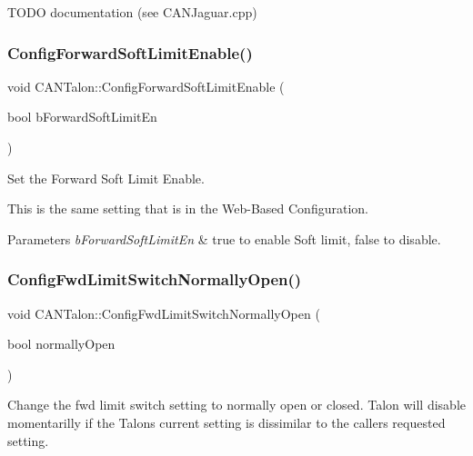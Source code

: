 T\+O\+DO documentation (see C\+A\+N\+Jaguar.\+cpp) \mbox{\label{class_c_a_n_talon_abd712f1d6f0a2be509e590437532141a}} 
\subsubsection{\texorpdfstring{Config\+Forward\+Soft\+Limit\+Enable()}{ConfigForwardSoftLimitEnable()}}
{\footnotesize\ttfamily void C\+A\+N\+Talon\+::\+Config\+Forward\+Soft\+Limit\+Enable (\begin{DoxyParamCaption}\item[{bool}]{b\+Forward\+Soft\+Limit\+En }\end{DoxyParamCaption})}

Set the Forward Soft Limit Enable.

This is the same setting that is in the Web-\/\+Based Configuration.


\begin{DoxyParams}{Parameters}
{\em b\+Forward\+Soft\+Limit\+En} & true to enable Soft limit, false to disable. \\
\hline
\end{DoxyParams}
\mbox{\label{class_c_a_n_talon_a5da34dc5d266817f0a666868f20429d8}} 
\subsubsection{\texorpdfstring{Config\+Fwd\+Limit\+Switch\+Normally\+Open()}{ConfigFwdLimitSwitchNormallyOpen()}}
{\footnotesize\ttfamily void C\+A\+N\+Talon\+::\+Config\+Fwd\+Limit\+Switch\+Normally\+Open (\begin{DoxyParamCaption}\item[{bool}]{normally\+Open }\end{DoxyParamCaption})}

Change the fwd limit switch setting to normally open or closed. Talon will disable momentarilly if the Talon\textquotesingle{}s current setting is dissimilar to the caller\textquotesingle{}s requested setting.

